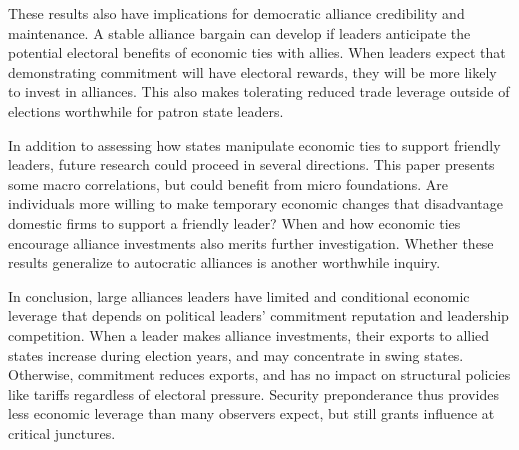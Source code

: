 \documentclass[12pt]{article}
\begin{document}
These results also have implications for democratic alliance credibility and maintenance. 
A stable alliance bargain can develop if leaders anticipate the potential electoral benefits of economic ties with allies.
When leaders expect that demonstrating commitment will have electoral rewards, they will be more likely to invest in alliances. 
This also makes tolerating reduced trade leverage outside of elections worthwhile for patron state leaders.


In addition to assessing how states manipulate economic ties to support friendly leaders, future research could proceed in several directions. 
This paper presents some macro correlations, but could benefit from micro foundations. 
Are individuals more willing to make temporary economic changes that disadvantage domestic firms to support a friendly leader? 
When and how economic ties encourage alliance investments also merits further investigation.
Whether these results generalize to autocratic alliances is another worthwhile inquiry. 


In conclusion, large alliances leaders have limited and conditional economic leverage that depends on political leaders' commitment reputation and leadership competition. 
When a leader makes alliance investments, their exports to allied states increase during election years, and may concentrate in swing states. 
Otherwise, commitment reduces exports, and has no impact on structural policies like tariffs regardless of electoral pressure. 
Security preponderance thus provides less economic leverage than many observers expect, but still grants influence at critical junctures.


\newpage
\singlespace
 
 
\end{document}
